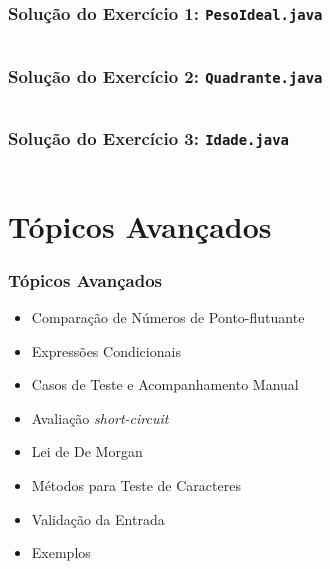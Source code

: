 \documentclass[xcolor={dvipsnames,table},aspectratio=169]{beamer}
\begin{document}
\begin{frame}\frametitle{Solução do Exercício 1: \texttt{PesoIdeal.java}}
	\scriptsize{\inputminted[bgcolor=cyan!10]{java}{src/PesoIdeal.java}}
\end{frame}

\begin{frame}\frametitle{Solução do Exercício 2: \texttt{Quadrante.java}}
	\tiny{\inputminted[bgcolor=cyan!10]{java}{src/Quadrante.java}}
\end{frame}

\begin{frame}\frametitle{Solução do Exercício 3: \texttt{Idade.java}}
	\tiny{\inputminted[bgcolor=cyan!10]{java}{src/Idade.java}}
\end{frame}

\section{Tópicos Avançados}

\begin{frame}[fragile]\frametitle{Tópicos Avançados}
\begin{itemize}
	\item Comparação de Números de Ponto-flutuante
	\item Expressões Condicionais
	\item Casos de Teste e Acompanhamento Manual
	\item Avaliação \emph{short-circuit}
	\item Lei de De Morgan
	\item Métodos para Teste de Caracteres
	\item Validação da Entrada
	\item Exemplos
\end{itemize}
\end{frame}
\end{document}
